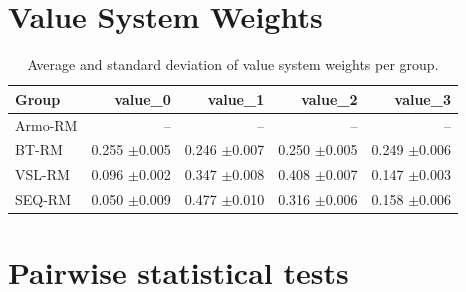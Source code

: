 \documentclass{article}
\begin{document}
\section*{Value System Weights}

\begin{table}[p]
\centering
\small
\caption{Average and standard deviation of value system weights per group.}
\label{tab:group-weights}
\begin{tabular}{lrrrr}
\toprule
Group & value\_0 & value\_1 & value\_2 & value\_3 \\
\midrule
Armo-RM & -- & -- & -- & -- \\
BT-RM & \makecell[r]{0.255 \\ $\pm$0.005} & \makecell[r]{0.246 \\ $\pm$0.007} & \makecell[r]{0.250 \\ $\pm$0.005} & \makecell[r]{0.249 \\ $\pm$0.006} \\
VSL-RM & \makecell[r]{0.096 \\ $\pm$0.002} & \makecell[r]{0.347 \\ $\pm$0.008} & \makecell[r]{0.408 \\ $\pm$0.007} & \makecell[r]{0.147 \\ $\pm$0.003} \\
SEQ-RM & \makecell[r]{0.050 \\ $\pm$0.009} & \makecell[r]{0.477 \\ $\pm$0.010} & \makecell[r]{0.316 \\ $\pm$0.006} & \makecell[r]{0.158 \\ $\pm$0.006} \\
\bottomrule
\end{tabular}
\end{table}

\section*{Pairwise statistical tests}
\end{document}
